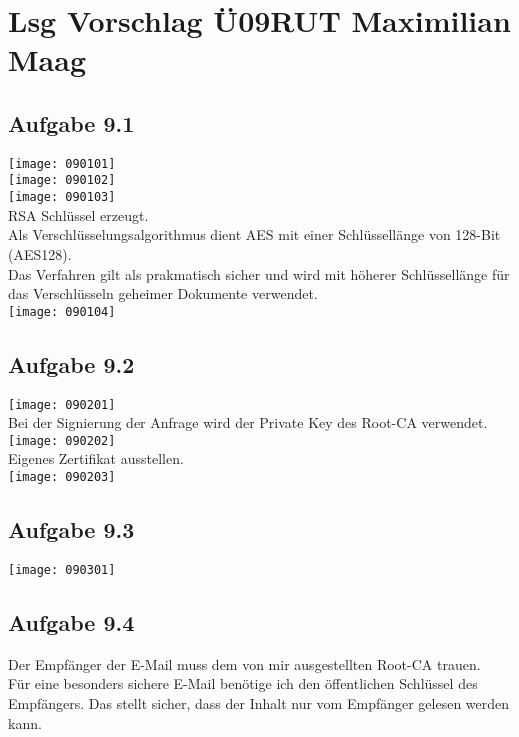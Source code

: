 \documentclass{article}
\begin{document}
	\section*{Lsg Vorschlag Ü09RUT Maximilian Maag}
	\subsection*{Aufgabe 9.1}
	\texttt{[image: 090101]} \\
	\texttt{[image: 090102]} \\
	\texttt{[image: 090103]} \\
	RSA Schlüssel erzeugt. \\
	Als Verschlüsselungsalgorithmus dient AES mit einer Schlüssellänge von 128-Bit (AES128). \\
	Das Verfahren gilt als prakmatisch sicher und wird mit höherer Schlüssellänge für das Verschlüsseln geheimer Dokumente verwendet. \\
	\texttt{[image: 090104]}
	\subsection*{Aufgabe 9.2}
	\texttt{[image: 090201]} \\
	Bei der Signierung der Anfrage wird der Private Key des Root-CA verwendet.
	\texttt{[image: 090202]} \\
	Eigenes Zertifikat ausstellen. \\
	\texttt{[image: 090203]}
	\subsection*{Aufgabe 9.3}
	\texttt{[image: 090301]}
	\subsection*{Aufgabe 9.4}
	Der Empfänger der E-Mail muss dem von mir ausgestellten Root-CA trauen. \\
	Für eine besonders sichere E-Mail benötige ich den öffentlichen Schlüssel des Empfängers. 
	Das stellt sicher, dass der Inhalt nur vom Empfänger gelesen werden kann.
\end{document}
